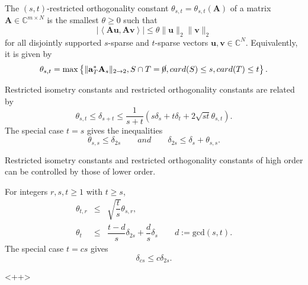 \begin{definition}
    \label{def2.4}
    The $(s,t)$-restricted orthogonality constant $\theta_{s,t} = \theta_{s,t}(\mathbf{A})$ of a matrix $\mathbf{A} \in \mathbb{C}^{m \times N}$ is the smallest $\theta \geq 0$ such that
    \begin{equation}
        \label{eq2.4}
        \left|\left<\mathbf{Au}, \mathbf{Av}\right>\right| \leq \theta \|\mathbf{u}\|_2 \|\mathbf{v}\|_2
    \end{equation}
    for all disjointly supported $s$-sparse and $t$-sparse vectors $\mathbf{u,v} \in \mathbb{C}^N$. Equivalently, it is given by 
    \begin{equation}
        \label{eq2.5}
        \theta_{s,t} = \max\left\{\|\mathbf{a}_T^*\mathbf{A}_s\|_{2 \rightarrow 2}, S \cap T = \cancel{0}, card(S) \leq s, card(T) \leq t\right\}.
    \end{equation}
\end{definition}

\begin{proposition}
    \label{pr2.5}
    Restricted isometry constants and restricted orthogonality constants are related by
    \begin{equation*}
        \theta_{s,t} \leq \delta_{s+t} \leq \dfrac{1}{s+t}(s\delta_s + t\delta_t +2 \sqrt{st}\theta_{s,t}).
    \end{equation*}
    The special case $t=s$ gives the inequalities
    \begin{equation*}
        \theta_{s,s} \leq \delta_{2s} \qquad and \qquad \delta_{2s} \leq \delta_s + \theta_{s,s}.
    \end{equation*}
\end{proposition}

Restricted isometry constants and restricted orthogonality constants of high order can be controlled by those of lower order.
\begin{proposition}
    \label{pr1.6}
    For integers $r,s,t \geq 1$ with $t \geq s$,
    \begin{eqnarray*}
        \theta_{t,r} &\leq& \sqrt{\dfrac{t}{s}}\theta_{s,r}, \\
    \theta_t &\leq& \dfrac{t-d}{s}\delta_{2s} + \dfrac{d}{s} \delta_s \qquad d:= \text{gcd}(s,t).
    \end{eqnarray*}
    The special case $t= cs$ gives 
    \[
        \delta_{cs} \leq c \delta_{2s}.
    \]
\end{proposition}<++>

















